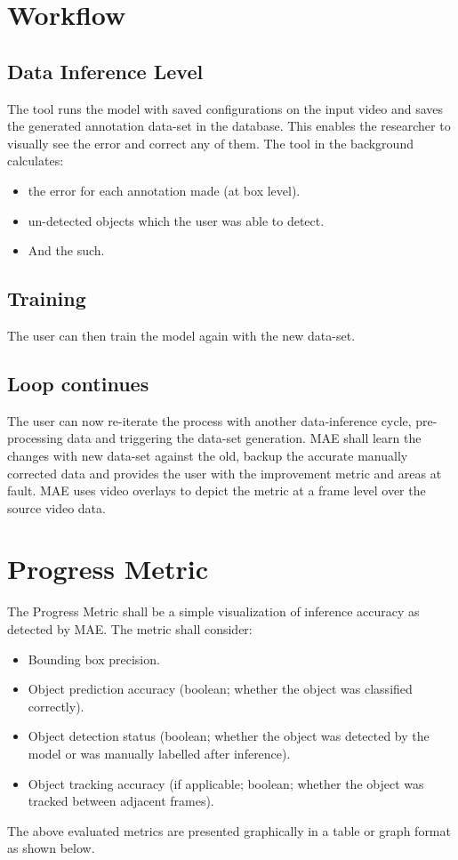 \documentclass[conference]{IEEEtran}
\begin{document}
\section{Workflow}
\subsection{Data Inference Level}
The tool runs the model with saved configurations on the input video and saves the generated annotation data-set in the database. This enables the researcher to visually see the error and correct any of them. The tool in the background calculates:
\begin{itemize}
	\item the error for each annotation made (at box level).
	\item un-detected objects which the user was able to detect.
	\item And the such.
\end{itemize}

\subsection{Training}
The user can then train the model again with the new data-set. 

\subsection{Loop continues}
The user can now re-iterate the process with another data-inference cycle, pre-processing data and triggering the data-set generation. MAE shall learn the changes with new data-set against the old, backup the accurate manually corrected data and provides the user with the improvement metric and areas at fault. MAE uses video overlays to depict the metric at a frame level over the source video data.

\section{Progress Metric}
The Progress Metric shall be a simple visualization of inference accuracy as detected by MAE. The metric shall consider:
\begin{itemize}
	\item Bounding box precision.
	\item Object prediction accuracy (boolean; whether the object was classified correctly).
	\item Object detection status (boolean; whether the object was detected by the model or was manually labelled after inference).
	\item Object tracking accuracy (if applicable; boolean; whether the object was tracked between adjacent frames).
\end{itemize}
The above evaluated metrics are presented graphically in a table or graph format as shown below. 
\end{document}
